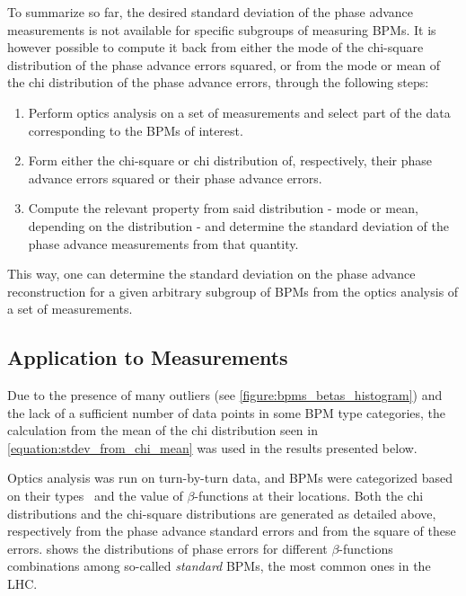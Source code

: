 To summarize so far, the desired standard deviation of the phase advance measurements is not available for specific subgroups of measuring BPMs.
It is however possible to compute it back from either the mode of the chi-square distribution of the phase advance errors squared, or from the mode or mean of the chi distribution of the phase advance errors, through the following steps:
\begin{enumerate}
    \item Perform optics analysis on a set of measurements and select part of the data corresponding to the BPMs of interest.
    \item Form either the chi-square or chi distribution of, respectively, their phase advance errors squared or their phase advance errors.
    \item Compute the relevant property from said distribution - mode or mean, depending on the distribution - and determine the standard deviation of the phase advance measurements from that quantity.
\end{enumerate}
This way, one can determine the standard deviation on the phase advance reconstruction for a given arbitrary subgroup of BPMs from the optics analysis of a set of measurements.

\subsection*{Application to Measurements}

Due to the presence of many outliers (see \cref{figure:bpms_betas_histogram}) and the lack of a sufficient number of data points in some BPM type categories, the calculation from the mean of the chi distribution seen in \cref{equation:stdev_from_chi_mean} was used in the results presented below.

Optics analysis was run on turn-by-turn data, and BPMs were categorized based on their types~\cite{CERN:Equipment_Codes} and the value of \(\beta\)-functions at their locations.
Both the chi distributions and the chi-square distributions are generated as detailed above, respectively from the phase advance standard errors and from the square of these errors.
 shows the distributions of phase errors for different \(\beta\)-functions combinations among so-called \textit{standard} BPMs, the most common ones in the LHC.

